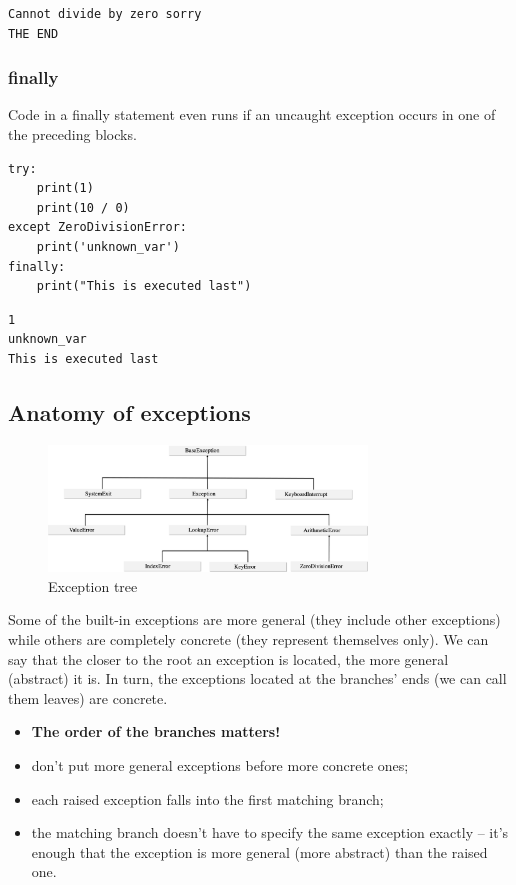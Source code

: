 \documentclass[11pt]{article}
\begin{document}
\begin{verbatim}
Cannot divide by zero sorry
THE END
\end{verbatim}



\newpage
\subsubsection{finally}
\label{sec:org70cd0ab}
Code in a finally statement even runs if an uncaught exception occurs
in one of the preceding blocks.

\begin{verbatim}
try:
    print(1)
    print(10 / 0)
except ZeroDivisionError:
    print('unknown_var')
finally:
    print("This is executed last")
\end{verbatim}

\begin{verbatim}
1
unknown_var
This is executed last
\end{verbatim}

\subsection{Anatomy of exceptions}
\label{sec:org6d4dcbb}

\begin{figure}[htbp]
\centering
\includegraphics[width=320px]{./images/exceptions.png}
\caption{Exception tree}
\end{figure}

Some of the built-in exceptions are more general (they include other
exceptions) while others are completely concrete (they represent
themselves only). We can say that the closer to the root an exception
is located, the more general (abstract) it is. In turn, the exceptions
located at the branches’ ends (we can call them leaves) are concrete.

\begin{itemize}
\item \textbf{The order of the branches matters!}
\item don’t put more general exceptions before more concrete ones;
\item each raised exception falls into the first matching branch;
\item the matching branch doesn’t have to specify the same exception
exactly – it’s enough that the exception is more general (more
abstract) than the raised one.
\end{itemize}
\end{document}
